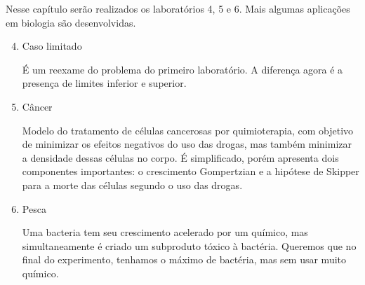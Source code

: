 Nesse capítulo serão realizados os laboratórios 4, 5 e 6. Mais algumas
aplicações em biologia são desenvolvidas.

\begin{enumerate}[label=\textbf{Lab \arabic*:}]
    \setcounter{enumi}{3}

    \item Caso limitado 
    
    É um reexame do problema do primeiro laboratório. A diferença agora é a
    presença de limites inferior e superior. 

    \item Câncer
    
    Modelo do tratamento de células cancerosas por quimioterapia, com objetivo
    de minimizar os efeitos negativos do uso das drogas, mas também minimizar
    a densidade dessas células no corpo. É simplificado, porém apresenta dois
    componentes importantes: o crescimento Gompertzian e a hipótese de Skipper
    para a morte das células segundo o uso das drogas. 

    \item Pesca  
    
    Uma bacteria tem seu crescimento acelerado por um químico, mas
    simultaneamente é criado um subproduto tóxico à bactéria. Queremos que no
    final do experimento, tenhamos o máximo de bactéria, mas sem usar muito
    químico. 
\end{enumerate}